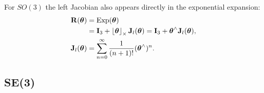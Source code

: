 For $SO(3)$ the left Jacobian also appears directly in the exponential expansion:
\begin{align}
\vect{R}(\vect{\theta}) &= \Exp(\vect{\theta}) \\
&= \vect{I}_3 + \skewsym{\vect{\theta}}\vect{J}_l(\vect{\theta}) = \vect{I}_3 + \vect{\theta}^{\wedge}\vect{J}_l(\vect{\theta}), \\
\vect{J}_l(\vect{\theta}) &= \sum_{n=0}^{\infty}\frac{1}{(n+1)!}(\vect{\theta}^{\wedge})^{n}.
\end{align}

\subsection{SE(3)}

